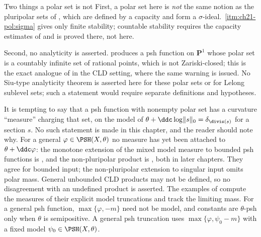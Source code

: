 \noindent\begin{minipage}{\textwidth}
\begin{warning}{Two things a polar set is not}
First, a polar set here is \emph{not} the same notion as the pluripolar sets
of , which are defined by a capacity and form a
$\sigma$-ideal.  \,\cref{itm:ch21-pol:sigma}
gives only finite stability; countable stability requires the capacity
estimates of  and is proved there, not here.

Second, no analyticity is asserted.  
produces a psh function on $\mathbf P^1$ whose polar set is a countably
infinite set of rational points, which is not Zariski-closed; this is the
exact analogue of  in the CLD setting, where
the same warning is issued.  No Siu-type analyticity theorem is asserted here for these polar sets
or for Lelong sublevel sets; such a statement would require separate
definitions and hypotheses.
\end{warning}
\end{minipage}\par

\begin{remark}
\label{rem:ch21-polar-ma}
It is tempting to say that a psh function with nonempty polar set has a
curvature ``measure'' charging that set, on the model of
$\theta+\ddc\log\lVert s\rVert_0=\delta_{\divis(s)}$ for a section $s$.
No such statement is made in this chapter, and the reader should note why.
For a general $\varphi\in\PSH(X,\theta)$ no measure has yet been attached
to $\theta+\ddc\varphi$: the monotone extension of the mixed model measure
to bounded psh functions is , and the
non-pluripolar product is , both in later
chapters.  They agree for bounded input; the non-pluripolar extension
to singular input omits polar mass.  General unbounded CLD products may
not be defined, so no disagreement with an undefined product is asserted.
The examples of  compute the measures of their
explicit model truncations and track the limiting mass.  For a general
psh function, $\max\{\varphi,-m\}$ need not be model, and constants
are $\theta$-psh only when $\theta$ is semipositive.  A general psh
truncation uses $\max\{\varphi,\psi_0-m\}$ with a fixed model
$\psi_0\in\PSH(X,\theta)$.
\end{remark}

